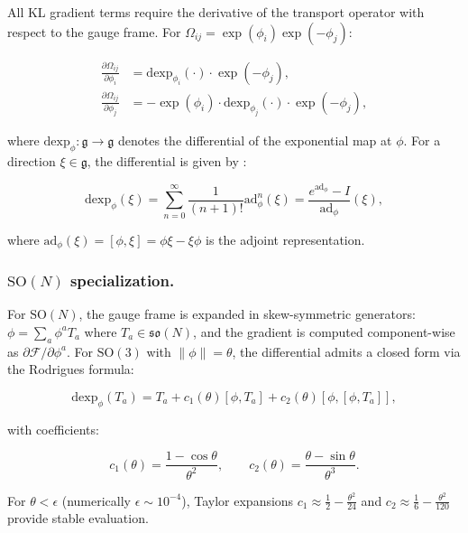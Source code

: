 \documentclass[twoside,11pt]{article}
\begin{document}
All KL gradient terms require the derivative of the transport operator with respect to the gauge frame. For $\Omega_{ij} = \exp(\phi_i)\exp(-\phi_j)$:

\begin{align}
\frac{\partial \Omega_{ij}}{\partial \phi_i} &= \mathrm{dexp}_{\phi_i}(\cdot) \cdot \exp(-\phi_j), \label{eq:dOmega_dphi_i} \\
\frac{\partial \Omega_{ij}}{\partial \phi_j} &= -\exp(\phi_i) \cdot \mathrm{dexp}_{\phi_j}(\cdot) \cdot \exp(-\phi_j), \label{eq:dOmega_dphi_j}
\end{align}

where $\mathrm{dexp}_\phi: \mathfrak{g} \to \mathfrak{g}$ denotes the differential of the exponential map at $\phi$. For a direction $\xi \in \mathfrak{g}$, the differential is given by \citep{gallier2020differential,rossmann2002lie}:

\begin{equation}
\mathrm{dexp}_\phi(\xi) = \sum_{n=0}^{\infty} \frac{1}{(n+1)!} \mathrm{ad}_\phi^n(\xi) = \frac{e^{\mathrm{ad}_\phi} - I}{\mathrm{ad}_\phi}(\xi),
\label{eq:dexp_series}
\end{equation}

where $\mathrm{ad}_\phi(\xi) = [\phi, \xi] = \phi\xi - \xi\phi$ is the adjoint representation.

\subsubsection{$\mathrm{SO}(N)$ specialization.}

For $\mathrm{SO}(N)$, the gauge frame is expanded in skew-symmetric generators: $\phi = \sum_a \phi^a T_a$ where $T_a \in \mathfrak{so}(N)$, and the gradient is computed component-wise as $\partial \mathcal{F}/\partial \phi^a$. For $\mathrm{SO}(3)$ with $\|\phi\| = \theta$, the differential admits a closed form via the Rodrigues formula:

\begin{equation}
\mathrm{dexp}_\phi(T_a) = T_a + c_1(\theta)[\phi, T_a] + c_2(\theta)[\phi, [\phi, T_a]],
\label{eq:dexp_so3}
\end{equation}

with coefficients:

\begin{equation}
c_1(\theta) = \frac{1 - \cos\theta}{\theta^2}, \qquad c_2(\theta) = \frac{\theta - \sin\theta}{\theta^3}.
\end{equation}

For $\theta < \epsilon$ (numerically $\epsilon \sim 10^{-4}$), Taylor expansions $c_1 \approx \frac{1}{2} - \frac{\theta^2}{24}$ and $c_2 \approx \frac{1}{6} - \frac{\theta^2}{120}$ provide stable evaluation.
\end{document}
